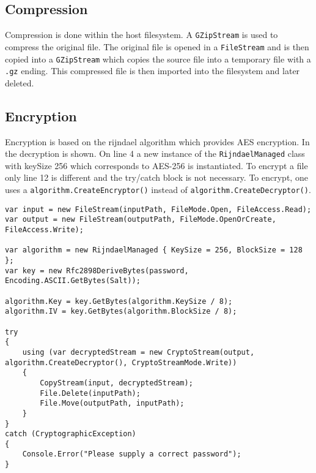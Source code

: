 \documentclass{report}
\begin{document}
\subsection{Compression}
Compression is done within the host filesystem. A \texttt{GZipStream} is used to compress the original file. The original file is opened in a \texttt{FileStream} and is then copied into a \texttt{GZipStream} which copies the source file into a temporary file with a \texttt{.gz} ending. This compressed file is then imported into the filesystem and later deleted.
\subsection{Encryption}
Encryption is based on the rijndael algorithm which provides AES encryption. In  the decryption is shown. On line 4 a new instance of the \texttt{RijndaelManaged} class with keySize 256 which corresponds to AES-256 is instantiated. To encrypt a file only line 12 is different and the try/catch block is not necessary. To encrypt, one uses a \texttt{algorithm.CreateEncryptor()} instead of \texttt{algorithm.CreateDecryptor()}. 
\begin{lstlisting}[label={lst:AES},caption=AES decryption]
var input = new FileStream(inputPath, FileMode.Open, FileAccess.Read);
var output = new FileStream(outputPath, FileMode.OpenOrCreate, FileAccess.Write);
            
var algorithm = new RijndaelManaged { KeySize = 256, BlockSize = 128 };
var key = new Rfc2898DeriveBytes(password, Encoding.ASCII.GetBytes(Salt));

algorithm.Key = key.GetBytes(algorithm.KeySize / 8);
algorithm.IV = key.GetBytes(algorithm.BlockSize / 8);

try
{
    using (var decryptedStream = new CryptoStream(output, algorithm.CreateDecryptor(), CryptoStreamMode.Write))
    {
        CopyStream(input, decryptedStream);
        File.Delete(inputPath);
        File.Move(outputPath, inputPath);
    }
}
catch (CryptographicException)
{
    Console.Error("Please supply a correct password");
}
\end{lstlisting}
\end{document}
